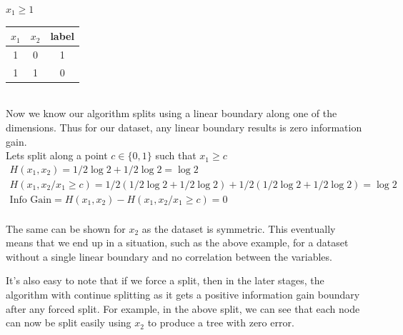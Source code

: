 \documentclass[a4paper]{article}
\theoremstyle{definition}
\newenvironment{soln}{
    \leavevmode\color{blue}\ignorespaces
}{}
\begin{document}
\begin{enumerate}
\begin{soln}
\begin{minipage}{0.3\linewidth}
        
        $x_1\geq 1$\\
        \begin{tabular}{|c|c|c|}
            \hline
            $x_1$ & $x_2$ & label \\
            \hline
            1 & 0 & 1 \\
            1 & 1 & 0 \\
            \hline
        \end{tabular}
    \end{minipage}\\
    Now we know our algorithm splits using a linear boundary along one of the dimensions. Thus for our dataset, any linear boundary results is zero information gain.\\ Lets split along a point $c \in \{0,1\}$ such that $x_1 \geq c$
    \begin{gather*}
        H(x_1,x_2) = 1/2\log{2}+1/2\log{2} = \log{2}\\
        H(x_1,x_2/x_1\geq c) = 1/2(1/2\log{2}+1/2\log{2}) + 1/2(1/2\log{2}+1/2\log{2}) = \log{2}\\
        \text{Info Gain} = H(x_1,x_2) - H(x_1,x_2/x_1\geq c) = 0
    \end{gather*}\\
   The same can be shown for $x_2$ as the dataset is symmetric. This eventually means that we end up in a situation, such as the above example, for a dataset without a single linear boundary and no correlation between the variables.

    It's also easy to note that if we force a split, then in the later stages, the algorithm with continue splitting as it gets a positive information gain boundary after any forced split. For example, in the above split, we can see that each node can now be split easily using $x_2$ to produce a tree with zero error.
\end{soln}


\end{enumerate}
\end{document}
